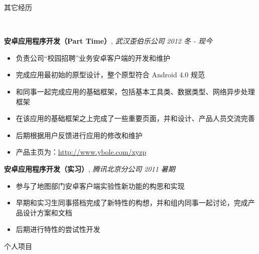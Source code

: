 \documentclass[9pt]{ctexart}
\newenvironment{changemargin}[2]{%
    \begin{list}{}{%
            \setlength{\topsep}{0pt}%
            \setlength{\leftmargin}{#1}%
            \setlength{\rightmargin}{#2}%
            \setlength{\listparindent}{\parindent}%
        \setlength{\itemindent}{\parindent}%
            \setlength{\parsep}{\parskip}%
        }%
  \item[]}{\end{list}
      }
\newcommand{\lineover}{
          \begin{changemargin}{-0.05in}{-0.05in}
              \vspace*{-8pt}
              \hrulefill \\
              \vspace*{-2pt}
          \end{changemargin}
      }
\newcommand{\header}[1]{
          \begin{changemargin}{-0.5in}{-0.5in}
              \scshape{#1}\\
              \lineover
          \end{changemargin}
      }
\newenvironment{body} {
          \vspace*{-16pt}
          \begin{changemargin}{-0.25in}{-0.5in}
          }	
      {\end{changemargin}
      }
\begin{document}
      \smallskip
      \newpage
      \header{其它经历}
       \begin{body}
          \vspace{14pt}
      \textbf{安卓应用程序开发（Part Time）}, \emph{武汉歪伯乐公司} \hfill \emph{2012 冬 - 现今}\\
          \vspace*{-4pt}
      \begin{itemize} \itemsep -0pt  %
              \item 负责公司“校园招聘”业务安卓客户端的开发和维护
              \item 完成应用最初始的原型设计，整个原型符合 Android 4.0 规范
              \item 和同事一起完成应用的基础框架，包括基本工具类、数据类型、网络异步处理框架
              \item 在该应用的基础框架之上完成了一些重要页面，并和设计、产品人员交流完善
              \item 后期根据用户反馈进行应用的修改和维护
              \item 产品主页为：\url{http://www.ybole.com/xyzp}
          \end{itemize}

          \textbf {安卓应用程序开发（实习）}, \emph{腾讯北京分公司} \hfill \emph{2011 暑期}\\
          \vspace*{-4pt}
      \begin{itemize} \itemsep -0pt
              \item 参与了地图部门安卓客户端实验性新功能的构思和实现
              \item 早期和实习生同事搭档完成了新特性的构想，并和组内同事一起讨论，完成产品设计方案和文档
              \item 后期进行特性的尝试性开发
          \end{itemize}

      \end{body}
      \header{个人项目}
\end{document}
